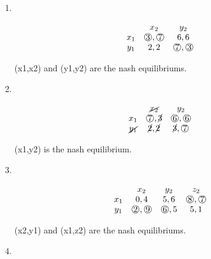\begin{enumerate}
    \item \phantom{text}\\
    \begin{latin}
        \begin{center}
            
\begin{equation*}
            \begin{matrix}
                    & x_2 & y_2 \\
                   x_1 & \circs{3},\circs{7} & 6,6 \\
                   y_1 & 2,2 & \circs{7},\circs{3} 
                \end{matrix}
            \end{equation*}
       \end{center}
       (x1,x2) and (y1,y2) are the nash equilibriums.
    \end{latin}
    \item \phantom{text}\\
    \begin{latin}
        \begin{center}
            
\begin{equation*}
            \begin{matrix}
                    & \cancel{x_2} & y_2 \\
                   x_1 & \circs{7},\cancel{3} & \circs{6} ,\circs{6}  \\
                   \cancel{y_1} & \cancel{2},\cancel{2} & \cancel{3},\circs{7}  
                \end{matrix}
            \end{equation*}
       \end{center}
       (x1,y2) is the nash equilibrium.
    \end{latin}
    \item \phantom{text}\\
    \begin{latin}
        \begin{center}
            
\begin{equation*}
            \begin{matrix}
                    & x_2 & y_2 & z_2 \\
                   x_1 & 0,4 & 5,6 & \circs{8},\circs{7} \\
                   y_1 & \circs{2},\circs{9} & \circs{6},5 & 5,1   
                \end{matrix}
            \end{equation*}
       \end{center}
       (x2,y1) and (x1,z2) are the nash equilibriums.
    \end{latin}
    \item \phantom{text}\\
    \begin{latin}
        \begin{center}
            

\end{center}
\end{latin}
\end{enumerate}
